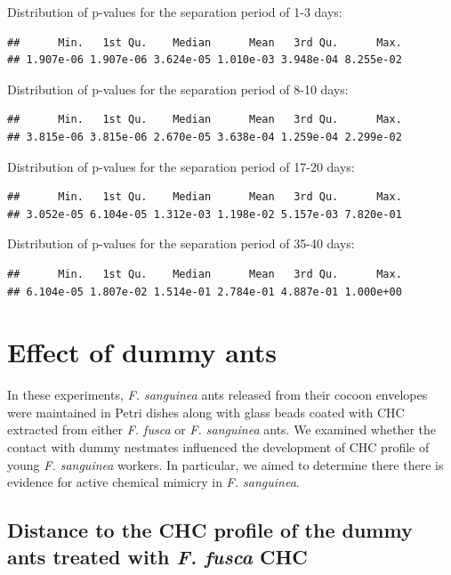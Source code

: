 \documentclass[
]{article}
\begin{document}
Distribution of p-values for the separation period of 1-3 days:

\begin{verbatim}
##      Min.   1st Qu.    Median      Mean   3rd Qu.      Max. 
## 1.907e-06 1.907e-06 3.624e-05 1.010e-03 3.948e-04 8.255e-02
\end{verbatim}

Distribution of p-values for the separation period of 8-10 days:

\begin{verbatim}
##      Min.   1st Qu.    Median      Mean   3rd Qu.      Max. 
## 3.815e-06 3.815e-06 2.670e-05 3.638e-04 1.259e-04 2.299e-02
\end{verbatim}

Distribution of p-values for the separation period of 17-20 days:

\begin{verbatim}
##      Min.   1st Qu.    Median      Mean   3rd Qu.      Max. 
## 3.052e-05 6.104e-05 1.312e-03 1.198e-02 5.157e-03 7.820e-01
\end{verbatim}

Distribution of p-values for the separation period of 35-40 days:

\begin{verbatim}
##      Min.   1st Qu.    Median      Mean   3rd Qu.      Max. 
## 6.104e-05 1.807e-02 1.514e-01 2.784e-01 4.887e-01 1.000e+00
\end{verbatim}

\section{Effect of dummy ants}\label{effect-of-dummy-ants}

In these experiments, \emph{F. sanguinea} ants released from their cocoon envelopes were maintained in Petri dishes along with glass beads coated with CHC extracted from either \emph{F. fusca} or \emph{F. sanguinea} ants. We examined whether the contact with dummy nestmates influenced the development of CHC profile of young \emph{F. sanguinea} workers. In particular, we aimed to determine there there is evidence for active chemical mimicry in \emph{F. sanguinea}.

\subsection{\texorpdfstring{Distance to the CHC profile of the dummy ants treated with \emph{F. fusca} CHC}{Distance to the CHC profile of the dummy ants treated with F. fusca CHC}}\label{distance-to-the-chc-profile-of-the-dummy-ants-treated-with-f.-fusca-chc}
\end{document}
